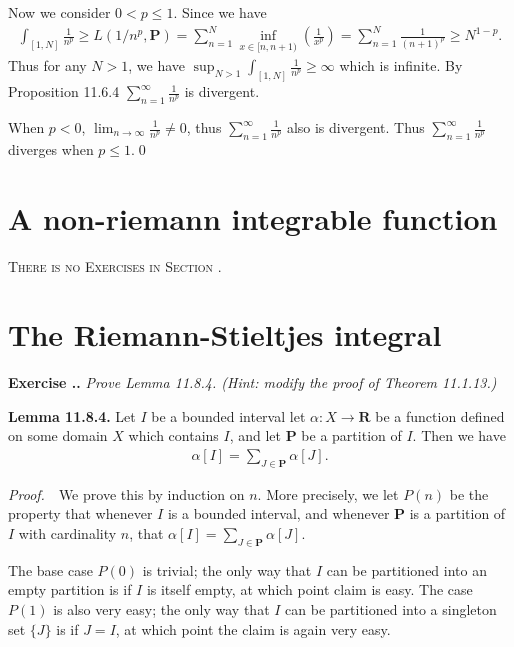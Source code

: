 \documentclass{book}
\newcommand{\pff}{\vspace{.25em}\noindent\emph{Proof.}~~}
\newcommand{\titl}[1]{\noindent\textbf{#1}}
\newcounter{Exercise}[section]
\renewcommand{\theExercise}{\thesection.\arabic{Exercise}.}
\newcommand{\new}{\vspace{1.5em}\noindent\textbf{{Exercise \stepcounter{Exercise}\textbf{\theExercise}}} }
\begin{document}
Now we consider $0< p \leq 1$. Since we have
    \begin{align*}
        \int_{[1, N]} \frac{1}{n^p}
        \geq L(1/n^p, \mathbf{P})
        = \sum_{n = 1}^{N} \inf_{x \in [n, n+1)} \left(\frac{1}{x^p}\right)
        = \sum_{n = 1}^{N} \frac{1}{(n+1)^p}
        \geq N^{1-p}.
    \end{align*}
Thus for any $N > 1$, we have $\sup_{N > 1}\int_{[1, N]} \frac{1}{n^p} \geq \infty$ which is infinite. By Proposition 11.6.4 $\sum_{n = 1}^{\infty} \frac{1}{n^p}$ is divergent.

When $p < 0$, $\lim_{n \to \infty} \frac{1}{n^p} \neq 0$, thus $\sum_{n = 1}^{\infty} \frac{1}{n^p}$ also is divergent. Thus $\sum_{n = 1}^{\infty} \frac{1}{n^p}$ diverges when $p \leq 1$.\qed

\section{A non-riemann integrable function}

\begin{center}
    \textsc{There is no Exercises in Section \thesection.}
\end{center}

\section{The Riemann-Stieltjes integral}

\new\emph{Prove Lemma 11.8.4. (Hint: modify the proof of Theorem 11.1.13.)}

\begin{framed}
\titl{Lemma 11.8.4.} Let $I$ be a bounded interval let $\alpha : X \to \mathbf{R}$ be a function defined on some domain $X$ which contains $I$, and let $\mathbf{P}$ be a partition of $I$. Then we have
    \begin{align*}
        \alpha[I] = \sum_{J \in \mathbf{P}} \alpha[J].
    \end{align*}
\end{framed}

\pff We prove this by induction on $n$. More precisely, we let $P(n)$ be the property that whenever $I$ is a bounded interval, and whenever $\mathbf{P}$ is a partition of $I$ with cardinality $n$, that $\alpha[I] = \sum_{J \in \mathbf{P}} \alpha[J]$.

The base case $P(0)$ is trivial; the only way that $I$ can be partitioned into an empty partition is if $I$ is itself empty, at which point claim is easy. The case $P(1)$ is also very easy; the only way that $I$ can be partitioned into a singleton set $\{J\}$ is if $J = I$, at which point the claim is again very easy.
\end{document}
